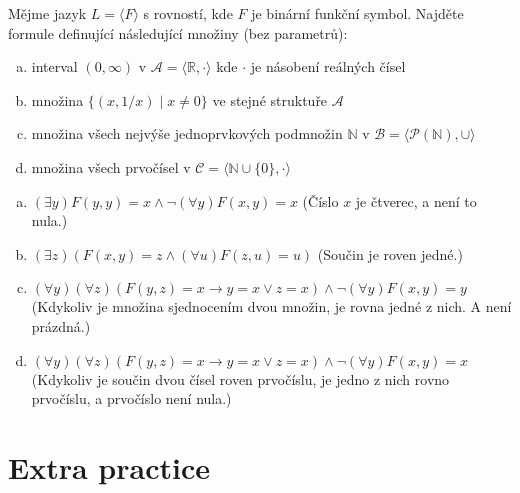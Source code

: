 \begin{problem}

    Mějme jazyk $L=\langle F \rangle$ s rovností, kde $F$ je binární funkční symbol. Najděte formule definující následující množiny (bez parametrů):
    \begin{enumerate}[(a)]
        \item interval $(0,\infty)$ v $\mathcal A=\langle\mathbb R, \cdot\rangle$ kde $\cdot$ je násobení reálných čísel
        \item množina $\{(x, 1/x)\mid x\neq 0\}$ ve stejné struktuře $\mathcal A$
        \item množina všech nejvýše jednoprvkových podmnožin $\mathbb N$ v $\mathcal B=\langle\mathcal P(\mathbb N),\cup\rangle$
        \item množina všech prvočísel v $\mathcal C=\langle \mathbb N\cup\{0\}, \cdot\rangle$
    \end{enumerate}

    \begin{solution}

        \begin{enumerate}[(a)]
            \item $(\exists y)F(y,y)=x\land \neg (\forall y)F(x,y)=x$ (Číslo $x$ je čtverec, a není to nula.)
            \item $(\exists z)(F(x,y)=z\land(\forall u)F(z,u)=u)$ (Součin je roven jedné.)
            \item $(\forall y)(\forall z)(F(y,z)=x\to y=x\lor z=x)\land\neg(\forall y)F(x,y)=y$ (Kdykoliv je množina sjednocením dvou množin, je rovna jedné z nich. A není prázdná.)
            \item $(\forall y)(\forall z)(F(y,z)=x\to y=x\lor z=x)\land\neg(\forall y)F(x,y)=x$ (Kdykoliv je součin dvou čísel roven prvočíslu, je jedno z nich rovno prvočíslu, a prvočíslo není nula.)
        \end{enumerate}
                    
    \end{solution}

\end{problem}
        
        
\section*{Extra practice}


